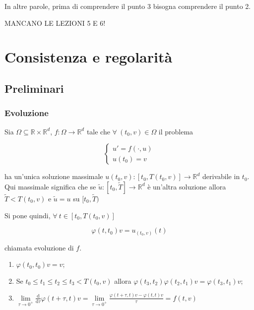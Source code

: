 \documentclass[hidelinks, 10pt]{report}
\begin{document}
In altre parole, prima di comprendere il punto 3 bisogna comprendere il punto 2.


										MANCANO LE LEZIONI 5 E 6!


\chapter{Consistenza e regolarit\`a}
\section{Preliminari}
\subsection{Evoluzione}
Sia $ \Omega \subseteq \mathbb{R} \times \mathbb{R}^{d} $, $ f: \Omega \to \mathbb{R}^{d} $ tale che $ \forall\ (t_{0}, v) \in \Omega $ il problema

\begin{equation}	\label{eq:probevol}
\begin{cases}
u' = f(\cdot, u) \\
u(t_{0}) = v
\end{cases}
\end{equation}

ha un'unica soluzione massimale $ u(t_{0}, v) : [t_{0}, T(t_{0}, v)] \to \mathbb{R}^{d} $ derivabile in $ t_{0} $. Qui massimale significa che se $ \tilde{u} : [t_{0}, \tilde{T}] \to \mathbb{R}^{d} $ \`e un'altra soluzione allora $ \tilde{T} < T(t_{0}, v) $ e $ \tilde{u} = u $ su $ [t_{0}, \tilde{T}) $

Si pone quindi, $ \forall\ t \in [t_{0}, T(t_{0}, v)] $

\[ \varphi(t, t_{0}) v = u_{(t_{0}, v)} (t) \]

chiamata evoluzione di $ f $.

\begin{oss}
\noindent
\begin{enumerate}
\item $ \varphi(t_{0}, t_{0}) v = v $;
\item Se $ t_{0} \le t_{1} \le t_{2} \le t_{3} < T(t_{0}, v) $ allora $ \varphi(t_{3}, t_{2}) \varphi(t_{2}, t_{1}) v = \varphi(t_{3}, t_{1}) v $;
\item $ \lim\limits_{\tau \to 0^{+}} \frac{\mathrm{d}}{\mathrm{d} \tau} \varphi (t + \tau, t)v = \lim\limits_{\tau \to 0^{+}} \frac{\varphi(t + \tau, t)v - \varphi(t, t)v}{\tau} = f(t, v) $
\end{enumerate}
\end{oss}
\end{document}
